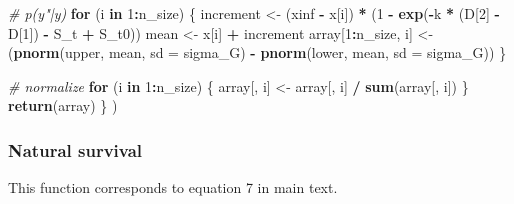 \documentclass[
]{article}
\newenvironment{Shaded}{\begin{snugshade}}{\end{snugshade}}
\newcommand{\AttributeTok}[1]{\textcolor[rgb]{0.13,0.29,0.53}{#1}}
\newcommand{\CommentTok}[1]{\textcolor[rgb]{0.56,0.35,0.01}{\textit{#1}}}
\newcommand{\ControlFlowTok}[1]{\textcolor[rgb]{0.13,0.29,0.53}{\textbf{#1}}}
\newcommand{\DecValTok}[1]{\textcolor[rgb]{0.00,0.00,0.81}{#1}}
\newcommand{\FunctionTok}[1]{\textcolor[rgb]{0.13,0.29,0.53}{\textbf{#1}}}
\newcommand{\NormalTok}[1]{#1}
\newcommand{\OtherTok}[1]{\textcolor[rgb]{0.56,0.35,0.01}{#1}}
\newcommand{\SpecialCharTok}[1]{\textcolor[rgb]{0.81,0.36,0.00}{\textbf{#1}}}
\begin{document}
\begin{Shaded}
\begin{Highlighting}[]
    \CommentTok{\# p(y"|y)}
    \ControlFlowTok{for}\NormalTok{ (i }\ControlFlowTok{in} \DecValTok{1}\SpecialCharTok{:}\NormalTok{n\_size) \{}
\NormalTok{      increment }\OtherTok{\textless{}{-}}\NormalTok{ (xinf }\SpecialCharTok{{-}}\NormalTok{ x[i]) }\SpecialCharTok{*}
\NormalTok{        (}\DecValTok{1} \SpecialCharTok{{-}} \FunctionTok{exp}\NormalTok{(}\SpecialCharTok{{-}}\NormalTok{k }\SpecialCharTok{*}\NormalTok{ (D[}\DecValTok{2}\NormalTok{] }\SpecialCharTok{{-}}\NormalTok{ D[}\DecValTok{1}\NormalTok{]) }\SpecialCharTok{{-}}\NormalTok{ S\_t }\SpecialCharTok{+}\NormalTok{ S\_t0))}
\NormalTok{      mean }\OtherTok{\textless{}{-}}\NormalTok{ x[i] }\SpecialCharTok{+}\NormalTok{ increment}
\NormalTok{      array[}\DecValTok{1}\SpecialCharTok{:}\NormalTok{n\_size, i] }\OtherTok{\textless{}{-}}\NormalTok{ (}\FunctionTok{pnorm}\NormalTok{(upper, mean, }\AttributeTok{sd =}\NormalTok{ sigma\_G) }\SpecialCharTok{{-}}
                               \FunctionTok{pnorm}\NormalTok{(lower, mean, }\AttributeTok{sd =}\NormalTok{ sigma\_G))}
\NormalTok{    \}}

    \CommentTok{\# normalize}
    \ControlFlowTok{for}\NormalTok{ (i }\ControlFlowTok{in} \DecValTok{1}\SpecialCharTok{:}\NormalTok{n\_size) \{}
\NormalTok{      array[, i] }\OtherTok{\textless{}{-}}\NormalTok{ array[, i] }\SpecialCharTok{/} \FunctionTok{sum}\NormalTok{(array[, i])}
\NormalTok{    \}}
  \FunctionTok{return}\NormalTok{(array)}
\NormalTok{\}}
\NormalTok{)}
\end{Highlighting}
\end{Shaded}

\subsubsection{Natural survival}\label{natural-survival}

This function corresponds to equation 7 in main text.
\end{document}
